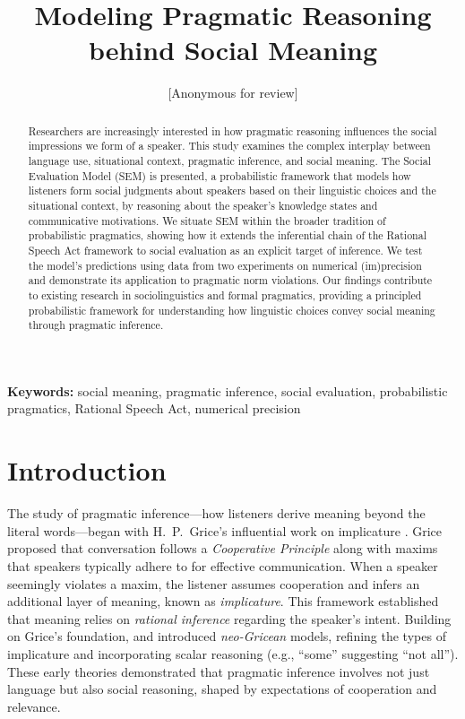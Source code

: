 \documentclass[12pt,a4paper]{article}
\title{Modeling Pragmatic Reasoning behind Social Meaning}
\author{[Anonymous for review]}
\date{}
\begin{document}
\maketitle

\begin{abstract}
Researchers are increasingly interested in how pragmatic reasoning influences
the social impressions we form of a speaker. This study examines the complex
interplay between language use, situational context, pragmatic inference, and
social meaning. The Social Evaluation Model (SEM) is presented, a probabilistic
framework that models how listeners form social judgments about speakers based
on their linguistic choices and the situational context, by reasoning about the
speaker's knowledge states and communicative motivations. We situate SEM within
the broader tradition of probabilistic pragmatics, showing how it extends the
inferential chain of the Rational Speech Act framework to social evaluation as
an explicit target of inference. We test the model's predictions using data from
two experiments on numerical (im)precision and demonstrate its application to
pragmatic norm violations. Our findings contribute to existing research in
sociolinguistics and formal pragmatics, providing a principled probabilistic
framework for understanding how linguistic choices convey social meaning through
pragmatic inference.
\end{abstract}

\noindent\textbf{Keywords:} social meaning, pragmatic inference, social
evaluation, probabilistic pragmatics, Rational Speech Act, numerical precision

\section{Introduction}

The study of pragmatic inference---how listeners derive meaning beyond the
literal words---began with H.~P.~Grice's influential work on implicature
\citep{grice}. Grice proposed that conversation follows a \emph{Cooperative
Principle} along with maxims that speakers typically adhere to for effective
communication. When a speaker seemingly violates a maxim, the listener assumes
cooperation and infers an additional layer of meaning, known as
\emph{implicature}. This framework established that meaning relies on
\emph{rational inference} regarding the speaker's intent. Building on Grice's
foundation, \citet{horn1989} and \citet{levinson2000} introduced
\emph{neo-Gricean} models, refining the types of implicature and incorporating
scalar reasoning (e.g., ``some'' suggesting ``not all''). These early theories
demonstrated that pragmatic inference involves not just language but also social
reasoning, shaped by expectations of cooperation and relevance.
\end{document}
